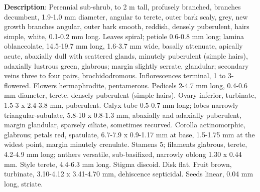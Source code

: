 \documentclass[fleqn,10pt,lineno]{wlpeerj} %
\begin{document}
\textbf{Description}: Perennial sub-shrub, to 2 m tall, profusely branched, branches decumbent, 1.9-1.0 mm diameter, angular to terete, outer bark scaly, grey, new growth branches angular, outer bark smooth, reddish, densely puberulent, hairs simple, white, 0.1-0.2 mm long. Leaves spiral; petiole 0.6-0.8 mm long; lamina oblanceolate, 14.5-19.7 mm long, 1.6-3.7 mm wide, basally attenuate, apically acute, abaxially dull with scattered glands, minutely puberulent (simple hairs), adaxially  lustrous green, glabrous; margin slightly serrate, glandular; secondary veins three to four pairs, brochidodromous. Inflorescences terminal, 1 to 3-flowered. Flowers hermaphrodite, pentamerous. Pedicels 2-4.7 mm long, 0.4-0.6 mm diameter, terete, densely puberulent (simple hairs). Ovary inferior, turbinate, 1.5-3 x 2.4-3.8 mm, puberulent. Calyx tube 0.5-0.7 mm long; lobes narrowly triangular-subulate, 5.8-10 x 0.8-1.3 mm, abaxially and adaxially puberulent, margin glandular, sparsely ciliate, sometimes recurved. Corolla actinomorphic, glabrous; petals red, spatulate, 6.7-7.9 x 0.9-1.17 mm at base, 1.5-1.75 mm at the widest point, margin minutely crenulate. Stamens 5; filaments glabrous, terete, 4.2-4.9 mm long; anthers versatile, sub-basifixed, narrowly oblong 1.30 x 0.44 mm. Style terete, 4.4-6.3 mm long. Stigma discoid. Disk flat. Fruit brown, turbinate, 3.10-4.12 x 3.41-4.70 mm, dehiscence septicidal. Seeds linear, 0.04 mm long, striate.
\end{document}
